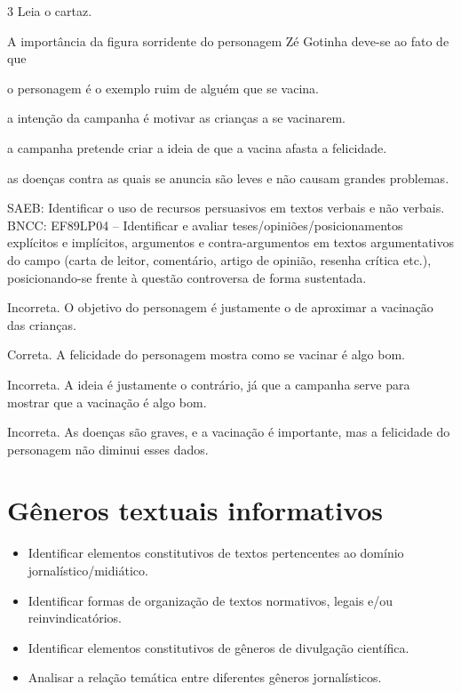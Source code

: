 \num{3} Leia o cartaz.


A importância da figura sorridente do personagem Zé Gotinha deve-se ao
fato de que

\begin{escolha}
\tightlist
\item
  o personagem é o exemplo ruim de alguém que se vacina.
\item
  a intenção da campanha é motivar as crianças a se vacinarem.
\item
  a campanha pretende criar a ideia de que a vacina afasta a felicidade.
\item
  as doenças contra as quais se anuncia são leves e não causam grandes
  problemas.
\end{escolha}

SAEB: Identificar o uso de recursos persuasivos em textos verbais e não
verbais. BNCC: EF89LP04 -- Identificar e avaliar
teses/opiniões/posicionamentos explícitos e implícitos, argumentos e
contra-argumentos em textos argumentativos do campo (carta de leitor,
comentário, artigo de opinião, resenha crítica etc.), posicionando-se
frente à questão controversa de forma sustentada.

\begin{escolha}
\tightlist
\item
  Incorreta. O objetivo do personagem é justamente o de aproximar a
  vacinação das crianças.
\item
  Correta. A felicidade do personagem mostra como se vacinar é algo bom.
\item
  Incorreta. A ideia é justamente o contrário, já que a campanha serve
  para mostrar que a vacinação é algo bom.
\item
  Incorreta. As doenças são graves, e a vacinação é importante, mas a
  felicidade do personagem não diminui esses dados.
\end{escolha}

\chapter{Gêneros textuais informativos}


\begin{itemize}
\item Identificar elementos constitutivos de textos pertencentes ao domínio jornalístico/midiático.
\item Identificar formas de organização de textos normativos, legais e/ou reinvindicatórios.
\item Identificar elementos constitutivos de gêneros de divulgação científica.
\item Analisar a relação temática entre diferentes gêneros jornalísticos.
\end{itemize}

